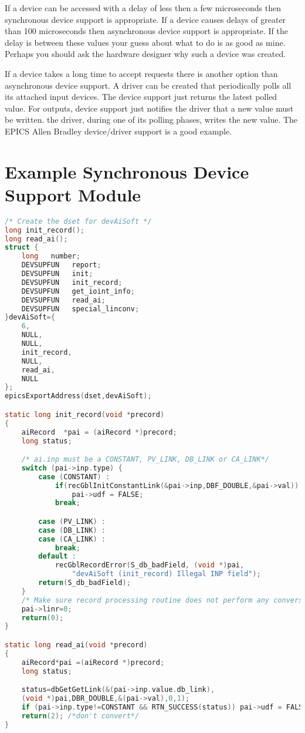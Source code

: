 If a device can be accessed with a delay of less then a few microseconds then synchronous device support is appropriate. 
If a device causes delays of greater than 100 microseconds then asynchronous device support is appropriate. If the delay is 
between these values your guess about what to do is as good as mine. Perhaps you should ask the hardware designer why 
such a device was created.

If a device takes a long time to accept requests there is another option than asynchronous device support. A driver can be 
created that periodically polls all its attached input devices. The device support just returns the latest polled value. For 
outputs, device support just notifies the driver that a new value must be written. the driver, during one of its polling 
phases, writes the new value. The EPICS Allen Bradley device/driver support is a good example.

\section{Example Synchronous Device Support Module}

\begin{lstlisting}[language=C]
/* Create the dset for devAiSoft */
long init_record();
long read_ai();
struct {
    long   number;
    DEVSUPFUN   report;
    DEVSUPFUN   init;
    DEVSUPFUN   init_record;
    DEVSUPFUN   get_ioint_info;
    DEVSUPFUN   read_ai;
    DEVSUPFUN   special_linconv;
}devAiSoft={
    6,
    NULL,
    NULL,
    init_record,
    NULL,
    read_ai,
    NULL
};
epicsExportAddress(dset,devAiSoft);

static long init_record(void *precord)
{
    aiRecord  *pai = (aiRecord *)precord;
    long status;

    /* ai.inp must be a CONSTANT, PV_LINK, DB_LINK or CA_LINK*/
    switch (pai->inp.type) {
        case (CONSTANT) :
            if(recGblInitConstantLink(&pai->inp,DBF_DOUBLE,&pai->val))
                pai->udf = FALSE;
            break;

        case (PV_LINK) :
        case (DB_LINK) :
        case (CA_LINK) :
            break;
        default :
            recGblRecordError(S_db_badField, (void *)pai,
                "devAiSoft (init_record) Illegal INP field");
        return(S_db_badField);
    }
    /* Make sure record processing routine does not perform any conversion*/
    pai->linr=0;
    return(0);
}

static long read_ai(void *precord)
{
    aiRecord*pai =(aiRecord *)precord;
    long status;

    status=dbGetGetLink(&(pai->inp.value.db_link),
    (void *)pai,DBR_DOUBLE,&(pai->val),0,1);
    if (pai->inp.type!=CONSTANT && RTN_SUCCESS(status)) pai->udf = FALSE;
    return(2); /*don't convert*/
}
\end{lstlisting}

